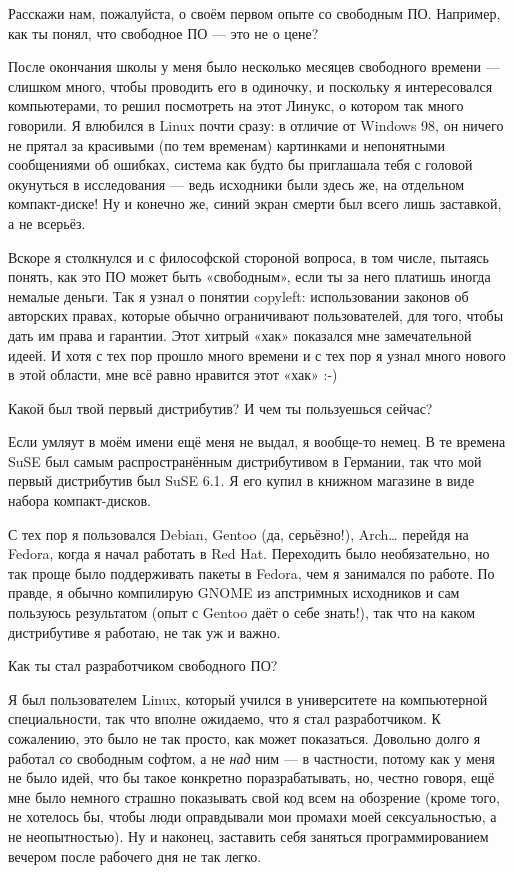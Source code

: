 \documentclass[10pt, a5paper]{article}
\begin{document}
\begin{Parallel}[p]{}{}
{\q Расскажи нам, пожалуйста, о своём первом опыте со свободным ПО. Например, как ты понял, что свободное ПО — это не о цене?

\a После окончания школы у меня было несколько месяцев свободного времени --- слишком много, чтобы проводить его в одиночку, и поскольку я интересовался компьютерами, то решил посмотреть на этот Линукс, о котором так много говорили. Я влюбился в Linux почти сразу: в отличие от Windows 98, он ничего не прятал за красивыми (по тем временам) картинками и непонятными сообщениями об ошибках, система как будто бы приглашала тебя с головой окунуться в исследования — ведь исходники были здесь же, на отдельном компакт-диске! Ну и конечно же, синий экран смерти был всего лишь заставкой\fakefootnote{}, а не всерьёз.

Вскоре я столкнулся и с философской стороной вопроса, в том числе, пытаясь понять, как это ПО может быть «свободным», если ты за него платишь иногда немалые деньги. Так я узнал о понятии copyleft: использовании законов об авторских правах, которые обычно ограничивают пользователей, для того, чтобы дать им права и гарантии. Этот хитрый «хак» показался мне замечательной идеей. И хотя с тех пор прошло много времени и с тех пор я узнал много нового в этой области, мне всё равно нравится этот «хак» :-)

\q Какой был твой первый дистрибутив? И чем ты пользуешься сейчас?

\a Если умляут в моём имени ещё меня не выдал, я вообще-то немец. В те времена SuSE был самым распространённым дистрибутивом в Германии, так что мой первый дистрибутив был SuSE 6.1\fakefootnote{}. Я его купил в книжном магазине в виде набора компакт-дисков.

С тех пор я пользовался Debian, Gentoo (да, серьёзно!), Arch… перейдя на Fedora, когда я начал работать в Red Hat. Переходить было необязательно, но так проще было поддерживать пакеты в Fedora, чем я занимался по работе. По правде, я обычно компилирую GNOME из апстримных исходников и сам пользуюсь результатом (опыт с Gentoo даёт о себе знать!)\fakefootnote{}, так что на каком дистрибутиве я работаю, не так уж и важно.

\q Как ты стал разработчиком свободного ПО?

\a Я был пользователем Linux, который учился в университете на компьютерной специальности, так что вполне ожидаемо, что я стал разработчиком. К сожалению, это было не так просто, как может показаться. Довольно долго я работал \emph{со} свободным софтом, а не \emph{над} ним — в частности, потому как у меня не было идей, что бы такое конкретно поразрабатывать, но, честно говоря, ещё мне было немного страшно показывать свой код всем на обозрение (кроме того, не хотелось бы, чтобы люди оправдывали мои промахи моей сексуальностью, а не неопытностью). Ну и наконец, заставить себя заняться программированием вечером после рабочего дня не так легко.

}
\end{Parallel}
\end{document}
